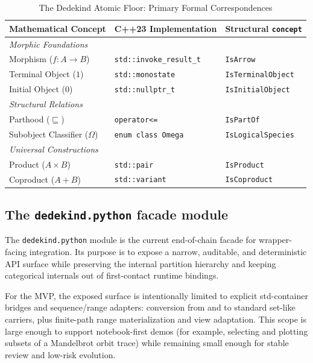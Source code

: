 \documentclass[11pt, a4paper]{report}
\begin{document}
\begin{table}[ht]
\centering
\caption{The Dedekind Atomic Floor: Primary Formal Correspondences}
\label{table:dedekind_floor}
\begin{tabular}{lll}
\toprule
\textbf{Mathematical Concept} & \textbf{C++23 Implementation} & \textbf{Structural \texttt{concept}} \\ 
\midrule
\textit{Morphic Foundations} & & \\
Morphism ($f: A \to B$) & \texttt{std::invoke\_result\_t} & \texttt{IsArrow} \\
Terminal Object ($1$) & \texttt{std::monostate} & \texttt{IsTerminalObject} \\
Initial Object ($0$) & \texttt{std::nullptr\_t} & \texttt{IsInitialObject} \\
\addlinespace
\textit{Structural Relations} & & \\
Parthood ($\sqsubseteq$) & \texttt{operator<=} & \texttt{IsPartOf} \\
Subobject Classifier ($\Omega$) & \texttt{enum class Omega} & \texttt{IsLogicalSpecies} \\
\addlinespace
\textit{Universal Constructions} & & \\
Product ($A \times B$) & \texttt{std::pair} & \texttt{IsProduct} \\
Coproduct ($A + B$) & \texttt{std::variant} & \texttt{IsCoproduct} \\
\bottomrule
\end{tabular}
\end{table}

\subsection{The \texttt{dedekind.python} facade module}
The \texttt{dedekind.python} module is the current end-of-chain facade for wrapper-facing integration. Its purpose is to expose a narrow, auditable, and deterministic API surface while preserving the internal partition hierarchy and keeping categorical internals out of first-contact runtime bindings.

For the MVP, the exposed surface is intentionally limited to explicit std-container bridges and sequence/range adapters: conversion from and to standard set-like carriers, plus finite-path range materialization and view adaptation. This scope is large enough to support notebook-first demos (for example, selecting and plotting subsets of a Mandelbrot orbit trace) while remaining small enough for stable review and low-risk evolution.
\end{document}
